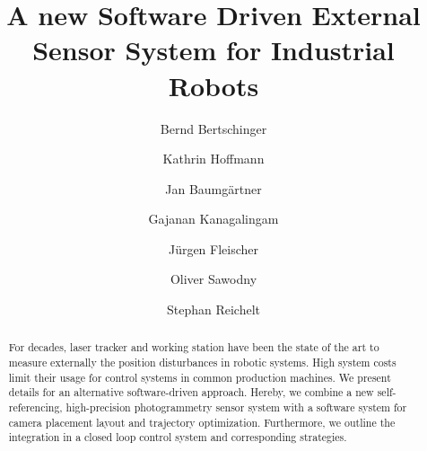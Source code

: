 \documentclass[5p,times,procedia]{elsarticle}
\begin{document}
\begin{frontmatter}
	
	
	
	
	\title{A new Software Driven External Sensor System for Industrial Robots}
	
	
	\author[a]{Bernd Bertschinger\corref{*}}
	\author[b]{Kathrin Hoffmann}
	\author[c]{Jan Baumgärtner}
	\author[b]{Gajanan Kanagalingam}
	\author[c]{Jürgen Fleischer}
	\author[b]{Oliver Sawodny}
	\author[a]{Stephan Reichelt}
	
	\address[a]{Institute of Applied Optics, University of Stuttgart - ITO, Pfaffenwaldring 9, 70569 Stuttgart, Germany}
	\address[b]{Institute for System Dynamics, University of Stuttgart - ISYS, Waldburgstr. 17/19, 70563 Stuttgart, Germany}
	\address[c]{Institute of Production Science, Karlsruhe Institute of Technology - WBK, Kaiserstraße 12, 76131 Karlsruhe, Germany}
	
	
	\begin{abstract}
		For decades, laser tracker and working station have been the state of the art to measure externally the position disturbances in robotic systems. High system costs limit their usage for control systems in common production machines. We present details for an alternative software-driven approach. Hereby, we combine a new self-referencing, high-precision photogrammetry sensor system with a software system for camera placement layout and trajectory optimization. Furthermore, we outline the integration in a closed loop control system and corresponding strategies.
	\end{abstract}
	

\end{frontmatter}
\end{document}
